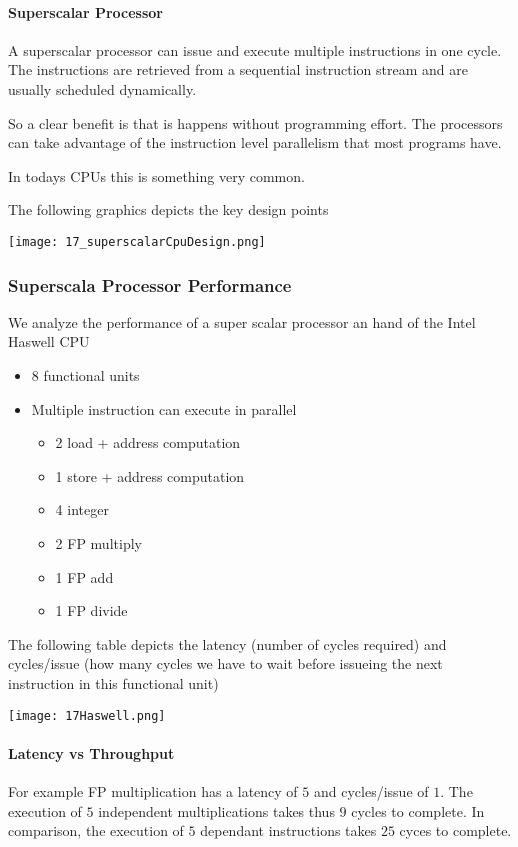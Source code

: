 \paragraph{Superscalar Processor}
A superscalar processor can issue and execute multiple instructions in one cycle. The instructions are retrieved from a sequential instruction stream and are usually scheduled dynamically.

So a clear benefit is that is happens without programming effort. The processors can take advantage of the instruction level parallelism that most programs have.

In todays CPUs this is something very common.

The following graphics depicts the key design points

\texttt{[image: 17\_superscalarCpuDesign.png]}

\subsubsection{Superscala Processor Performance}
We analyze the performance of a super scalar processor an hand of the Intel Haswell CPU
\begin{itemize}
    \item 8 functional units
    \item Multiple instruction can execute in parallel
        \begin{itemize}
            \item 2 load + address computation
            \item 1 store + address computation
            \item 4 integer
            \item 2 FP multiply
            \item 1 FP add
            \item 1 FP divide
        \end{itemize}
\end{itemize}

The following table depicts the latency (number of cycles required) and cycles/issue (how many cycles we have to wait before issueing the next instruction in this functional unit)

\texttt{[image: 17Haswell.png]}

\paragraph{Latency vs Throughput}
For example FP multiplication has a latency of $5$ and cycles/issue of $1$. The execution of $5$ independent multiplications takes thus $9$ cycles to complete. In comparison, the execution of $5$ dependant instructions takes $25$ cyces to complete.

